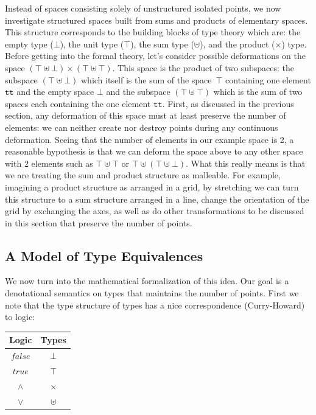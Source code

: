 \documentclass{article}
\newcommand{\true}{\mathit{true}}
\newcommand{\false}{\mathit{false}}
\begin{document}
Instead of spaces consisting solely of unstructured isolated points,
we now investigate structured spaces built from sums and products of
elementary spaces. This structure corresponds to the building blocks
of type theory which are: the empty type ($\bot$), the unit type
($\top$), the sum type ($\uplus$), and the product ($\times$)
type. Before getting into the formal theory, let's consider possible
deformations on the space
$(\top \uplus \bot) \times (\top \uplus \top)$. This space is the
product of two subspaces: the subspace $(\top \uplus \bot)$ which
itself is the sum of the space~$\top$ containing one element
$\texttt{tt}$ and the empty space $\bot$ and the subspace
$(\top \uplus \top)$ which is the sum of two spaces each containing
the one element $\texttt{tt}$. First, as discussed in the previous
section, any deformation of this space must at least preserve the
number of elements: we can neither create nor destroy points during
any continuous deformation. Seeing that the number of elements in our
example space is 2, a reasonable hypothesis is that we can deform the
space above to any other space with 2 elements such as
$\top \uplus \top$ or $\top \uplus (\top \uplus \bot)$. What this
really means is that we are treating the sum and product structure as
malleable. For example, imagining a product structure as arranged in a
grid, by stretching we can turn this structure to a sum structure
arranged in a line, change the orientation of the grid by exchanging
the axes, as well as do other transformations to be discussed in this
section that preserve the number of points.

\subsection{A Model of Type Equivalences} 

We now turn into the mathematical formalization of this idea. Our goal
is a denotational semantics on types that maintains the number of
points. First we note that the type structure of types has a nice
correspondence (Curry-Howard) to logic:

\begin{center}
\begin{tabular}{c|c}
Logic & Types \\ \hline
$\false$ & $\bot$ \\
$\true$ & $\top$ \\
$\land$ & $\times$ \\
$\lor$ & $\uplus$ \\
\end{tabular}
\end{center}
\end{document}

